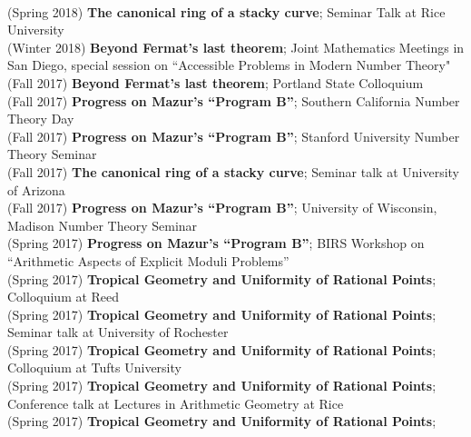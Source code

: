 \documentclass[margin,line]{res}
\begin{document}
\begin{resume}
\vspace{.05cm}\\
(Spring 2018) \textbf{The canonical ring of a stacky curve};  
Seminar Talk at Rice University
\vspace{.05cm}\\
(Winter 2018) \textbf{Beyond Fermat's last theorem};
Joint Mathematics Meetings in San Diego, special session on ``Accessible Problems in Modern Number Theory" 
\vspace{.05cm}\\
(Fall 2017) \textbf{Beyond Fermat's last theorem};
Portland State Colloquium
\vspace{.05cm}\\
(Fall 2017) \textbf{Progress on Mazur's ``Program B''};  
Southern California Number Theory Day
\vspace{.05cm}\\
(Fall 2017) \textbf{Progress on Mazur's ``Program B''};  
Stanford University Number Theory Seminar
\vspace{.05cm}\\
(Fall 2017) \textbf{The canonical ring of a stacky curve};  
Seminar talk at University of Arizona
\vspace{.05cm}\\
(Fall 2017) \textbf{Progress on Mazur's ``Program B''};  
University of Wisconsin, Madison Number Theory Seminar
\vspace{.05cm}\\
(Spring 2017) \textbf{Progress on Mazur's ``Program B''};  
BIRS Workshop on ``Arithmetic Aspects of Explicit Moduli Problems''
\vspace{.05cm}\\
(Spring 2017) \textbf{Tropical Geometry and Uniformity of Rational Points};
Colloquium at Reed 
\vspace{.05cm}\\
(Spring 2017) \textbf{Tropical Geometry and Uniformity of Rational Points};
Seminar talk at University of Rochester
\vspace{.05cm}\\
(Spring 2017) \textbf{Tropical Geometry and Uniformity of Rational Points};
Colloquium at Tufts University 
\vspace{.05cm}\\
(Spring 2017) \textbf{Tropical Geometry and Uniformity of Rational Points};
Conference talk at Lectures in Arithmetic Geometry at Rice
\vspace{.05cm}\\
(Spring 2017) \textbf{Tropical Geometry and Uniformity of Rational Points};

\end{resume}
\end{document}
